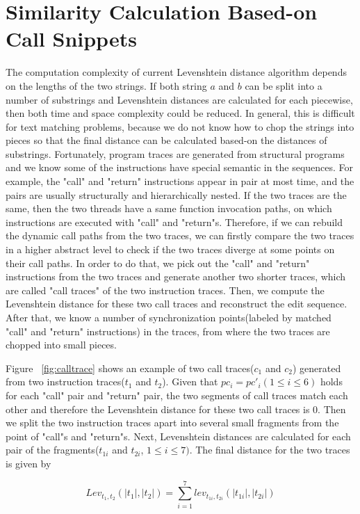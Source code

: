 \documentclass[10pt,journal,cspaper,compsoc]{IEEEtran}
\begin{document}
\section{Similarity Calculation Based-on Call Snippets}
The computation complexity of current Levenshtein distance algorithm
depends on the lengths of the two strings. If both string $a$ and
$b$ can be split into a number of substrings and Levenshtein
distances are calculated for each piecewise, then both time and
space complexity could be reduced. In general, this is difficult for
text matching problems, because we do not know how to chop the
strings into pieces so that the final distance can be calculated
based-on the distances of substrings. Fortunately, program traces
are generated from structural programs and we know some of the
instructions have special semantic in the sequences. For example,
the "call" and "return" instructions appear in pair at most time,
and the pairs are usually structurally and hierarchically nested. If
the two traces are the same, then the two threads have a same
function invocation paths, on which instructions are executed with
"call" and "return"s. Therefore, if we can rebuild the dynamic call
paths from the two traces, we can firstly compare the two traces in
a higher abstract level to check if the two traces diverge at some
points on their call paths. In order to do that, we pick out the
"call" and "return" instructions from the two traces and generate
another two shorter traces, which are called "call traces" of the
two instruction traces. Then, we compute the Levenshtein distance
for these two call traces and reconstruct the edit sequence. After
that, we know a number of synchronization points(labeled by matched
"call" and "return" instructions) in the traces, from where the two
traces are chopped into small pieces.

Figure ~\ref{fig:calltrace} shows an example of two call
traces($c_1$ and $c_2$) generated from two instruction traces($t_1$
and $t_2$). Given that $pc_i=pc'_i (1\leq i\leq 6)$ holds for each
"call" pair and "return" pair, the two segments of call traces match
each other and therefore the Levenshtein distance for these two call
traces is 0. Then we split the two instruction traces apart into
several small fragments from the point of "call"s and "return"s.
Next, Levenshtein distances are calculated for each pair of the
fragments($t_{1i}$ and $t_{2i}$, $1\leq i\leq 7)$. The final
distance for the two traces is given by

\begin{equation}\label{eq:callle}
 Lev_{t_{1},t_{2}}(|t_1|,|t_2|) =\sum_{i=1}^{7}lev_{t_{1i},t_{2i}}(|t_{1i}|, |t_{2i}|)
\end{equation}
\end{document}
